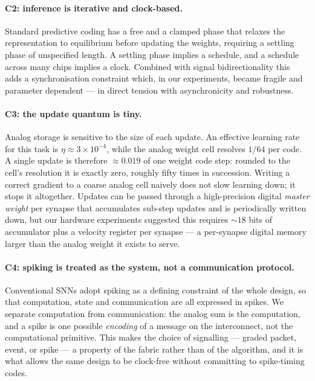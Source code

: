 \documentclass[11pt]{article}
\begin{document}
\hypertarget{c2-inference-is-iterative-and-clock-based.}{%
\paragraph{C2: inference is iterative and
clock-based.}\label{c2-inference-is-iterative-and-clock-based.}}

Standard predictive coding has a free and a clamped phase that relaxes
the representation to equilibrium before updating the weights, requiring
a settling phase of unspecified length. A settling phase implies a
schedule, and a schedule across many chips implies a clock. Combined
with signal bidirectionality this adds a synchronisation constraint
which, in our experiments, became fragile and parameter dependent --- in
direct tension with asynchronicity and robustness.

\hypertarget{c3-the-update-quantum-is-tiny.}{%
\paragraph{C3: the update quantum is
tiny.}\label{c3-the-update-quantum-is-tiny.}}

Analog storage is sensitive to the size of each update. An effective
learning rate for this task is \(\eta \approx 3\times10^{-4}\), while
the analog weight cell resolves \(1/64\) per code. A single update is
therefore \(\approx 0.019\) of one weight code step: rounded to the
cell's resolution it is exactly zero, roughly fifty times in succession.
Writing a correct gradient to a coarse analog cell naively does not slow
learning down; it stops it altogether. Updates can be passed through a
high-precision digital \emph{master weight} per synapse that accumulates
sub-step updates and is periodically written down, but our hardware
experiments suggested this requires \(\sim 18\) bits of accumulator plus
a velocity register per synapse --- a per-synapse digital memory larger
than the analog weight it exists to serve.

\hypertarget{c4-spiking-is-treated-as-the-system-not-a-communication-protocol.}{%
\paragraph{C4: spiking is treated as the system, not a communication
protocol.}\label{c4-spiking-is-treated-as-the-system-not-a-communication-protocol.}}

Conventional SNNs adopt spiking as a defining constraint of the whole
design, so that computation, state and communication are all expressed
in spikes. We separate computation from communication: the analog sum is
the computation, and a spike is one possible \emph{encoding} of a
message on the interconnect, not the computational primitive. This makes
the choice of signalling --- graded packet, event, or spike --- a
property of the fabric rather than of the algorithm, and it is what
allows the same design to be clock-free without committing to
spike-timing codes.
\end{document}
